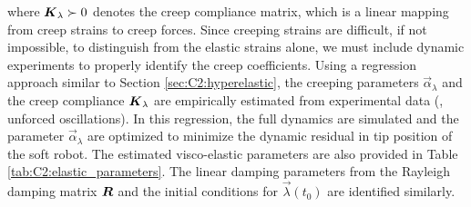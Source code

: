 %
\noindent where $\boldsymbol{K}_\lambda \succ 0$ denotes the creep compliance matrix, which is a linear mapping from creep strains to creep forces. Since creeping strains are difficult, if not impossible, to distinguish from the elastic strains alone, we must include dynamic experiments to properly identify the creep coefficients. Using a regression approach similar to Section \ref{sec:C2:hyperelastic}, the creeping parameters $\vec{\alpha}_\lambda$ and the creep compliance $\boldsymbol{K}_\lambda$ are empirically estimated from experimental data (\eg, unforced oscillations). In this regression, the full dynamics are simulated and the parameter $\vec{\alpha}_\lambda$ are optimized to minimize the dynamic residual in tip position of the soft robot. The estimated visco-elastic parameters are also provided in Table \ref{tab:C2:elastic_parameters}. The linear damping parameters from the Rayleigh damping matrix $\boldsymbol{R}$ and the initial conditions for $\vec{\lambda}(t_0)$ are identified similarly.

